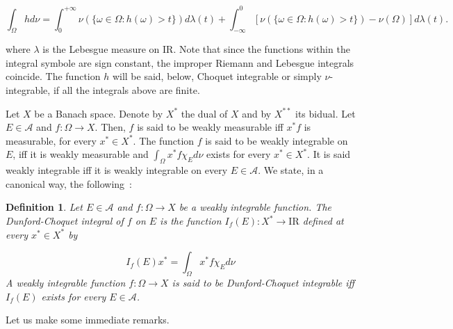 \documentclass[preprint,authoryear,12pt]{article}%
\newtheorem{definition}{Definition\rm}
\theoremstyle{definition}
\renewcommand{\AA}{{\mathcal A}}
\newcommand{\IR}{{\mathrm{I\!R}}}
\begin{document}
$$ \int_\Omega hd\nu=\int_0^{+\infty} \nu(\{\omega\in \Omega : h(\omega)>t\}) d\lambda(t) +\int^0_{-\infty}\left[ \nu(\{\omega\in \Omega : h(\omega)>t\}) -\nu(\Omega)\right]d\lambda(t).$$

where $\lambda$ is the Lebesgue measure on $\IR$. Note that since the functions within the integral symbole are sign constant, the improper Riemann and Lebesgue integrals coincide. The function $h$ will be said, below, Choquet integrable or simply $\nu$-integrable, if all the integrals above are finite.



\medskip
Let $X$ be a Banach space. Denote by $X^*$ the dual of $X$ and by $X^{**}$ its bidual. Let $E\in \AA$ and $f:\Omega\rightarrow X$. Then, $f$ is said to be weakly measurable iff $x^*f$ is measurable, for every $x^*\in X^*$.  The function $f$ is said to be weakly integrable on $E$, iff it is weakly measurable and $\int_\Omega x^*f \chi_Ed\nu$ exists for every $x^*\in X^*$. It is said weakly integrable iff it is weakly integrable on every $E\in \AA$. We state, in a canonical way, the following~:


\begin{definition}\label{DDC} Let $E\in \AA$  and $f:\Omega \rightarrow X$ be a weakly integrable function. The Dunford-Choquet integral of $f$ on $E$ is the function  $I_f(E) :X^*\rightarrow \IR$ defined at every $x^*\in X^*$ by 

$$ I_f(E)x^*= \int_\Omega x^* f\chi_E d\nu$$
A weakly integrable function $f:\Omega\rightarrow X$ is said to be Dunford-Choquet integrable iff $I_f(E) $ exists for every $E\in \AA$.
\end{definition}


Let us make some immediate remarks. 
\end{document}
